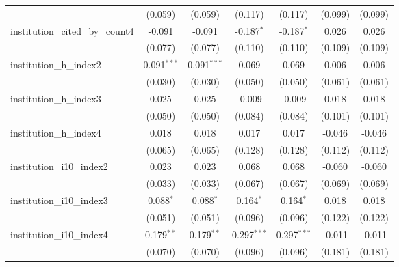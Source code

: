 \begin{tabular}{lcccccc}
                                         & (0.059)        & (0.059)        & (0.117)       & (0.117)       & (0.099)        & (0.099)\\   
   institution\_cited\_by\_count4        & -0.091         & -0.091         & -0.187$^{*}$  & -0.187$^{*}$  & 0.026          & 0.026\\   
                                         & (0.077)        & (0.077)        & (0.110)       & (0.110)       & (0.109)        & (0.109)\\   
   institution\_h\_index2                & 0.091$^{***}$  & 0.091$^{***}$  & 0.069         & 0.069         & 0.006          & 0.006\\   
                                         & (0.030)        & (0.030)        & (0.050)       & (0.050)       & (0.061)        & (0.061)\\   
   institution\_h\_index3                & 0.025          & 0.025          & -0.009        & -0.009        & 0.018          & 0.018\\   
                                         & (0.050)        & (0.050)        & (0.084)       & (0.084)       & (0.101)        & (0.101)\\   
   institution\_h\_index4                & 0.018          & 0.018          & 0.017         & 0.017         & -0.046         & -0.046\\   
                                         & (0.065)        & (0.065)        & (0.128)       & (0.128)       & (0.112)        & (0.112)\\   
   institution\_i10\_index2              & 0.023          & 0.023          & 0.068         & 0.068         & -0.060         & -0.060\\   
                                         & (0.033)        & (0.033)        & (0.067)       & (0.067)       & (0.069)        & (0.069)\\   
   institution\_i10\_index3              & 0.088$^{*}$    & 0.088$^{*}$    & 0.164$^{*}$   & 0.164$^{*}$   & 0.018          & 0.018\\   
                                         & (0.051)        & (0.051)        & (0.096)       & (0.096)       & (0.122)        & (0.122)\\   
   institution\_i10\_index4              & 0.179$^{**}$   & 0.179$^{**}$   & 0.297$^{***}$ & 0.297$^{***}$ & -0.011         & -0.011\\   
                                         & (0.070)        & (0.070)        & (0.096)       & (0.096)       & (0.181)        & (0.181)\\   

\end{tabular}
